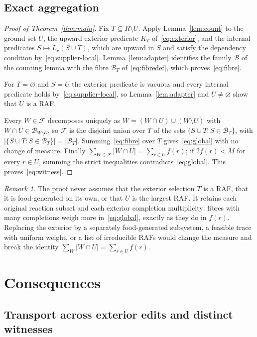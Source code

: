 \documentclass[11pt,a4paper]{article}
\theoremstyle{plain}
\theoremstyle{definition}
\theoremstyle{remark}
\newtheorem{remark}[theorem]{Remark}
\newcommand{\FF}{\mathcal F}
\newcommand{\BB}{\mathcal B}
\begin{document}
\subsection{Exact aggregation}\label{sec:aggregate}

\begin{proof}[Proof of Theorem~\ref{thm:main}]
Fix $T\subseteq R\setminus U$. Apply Lemma~\ref{lem:count} to the ground set $U$, the upward exterior predicate $K_T$ of~\eqref{eq:exterior}, and the internal predicates $S\mapsto L_r(S\cup T)$, which are upward in $S$ and satisfy the dependency condition by~\eqref{eq:supplier-local}. Lemma~\ref{lem:adapter} identifies the family $\BB$ of the counting lemma with the fibre $\BB_T$ of~\eqref{eq:fibredef}, which proves~\eqref{eq:fibre}.

For $T=\varnothing$ and $S=U$ the exterior predicate is vacuous and every internal predicate holds by~\eqref{eq:supplier-local}, so Lemma~\ref{lem:adapter} and $U\ne\varnothing$ show that $U$ is a RAF.

Every $W\in\FF$ decomposes uniquely as $W=(W\cap U)\cup(W\setminus U)$ with $W\cap U\in\BB_{W\setminus U}$, so $\FF$ is the disjoint union over $T$ of the sets $\{S\cup T:S\in\BB_T\}$, with $|\{S\cup T:S\in\BB_T\}|=|\BB_T|$. Summing~\eqref{eq:fibre} over $T$ gives~\eqref{eq:global} with no change of measure. Finally $\sum_{W\in\FF}|W\cap U|=\sum_{r\in U}f(r)$; if $2f(r)<M$ for every $r\in U$, summing the strict inequalities contradicts~\eqref{eq:global}. This proves~\eqref{eq:witness}.
\end{proof}

\begin{remark}
The proof never assumes that the exterior selection $T$ is a RAF, that it is food-generated on its own, or that $U$ is the largest RAF. It retains each original reaction subset and each exterior completion multiplicity: fibres with many completions weigh more in~\eqref{eq:global}, exactly as they do in $f(r)$. Replacing the exterior by a separately food-generated subsystem, a feasible trace with uniform weight, or a list of irreducible RAFs would change the measure and break the identity $\sum_W|W\cap U|=\sum_{r\in U}f(r)$.
\end{remark}

\section{Consequences}\label{sec:consequences}

\subsection{Transport across exterior edits and distinct witnesses}
\end{document}
